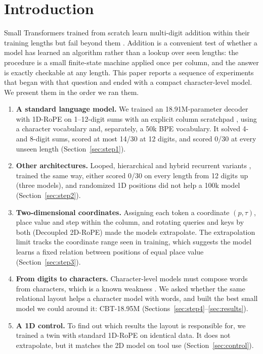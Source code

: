 \documentclass[10pt,twocolumn]{article}
\begin{document}
\section{Introduction}\label{sec:intro}

Small Transformers trained from scratch learn multi-digit addition within their training lengths but fail beyond them \cite{nogueira2021investigating,jelassi2023length,dziri2023faith,kazemnejad2023impact,mcleish2024transformers}. Addition is a convenient test of whether a model has learned an algorithm rather than a lookup over seen lengths: the procedure is a small finite-state machine applied once per column, and the answer is exactly checkable at any length. This paper reports a sequence of experiments that began with that question and ended with a compact character-level model. We present them in the order we ran them.

\begin{enumerate}
\item \textbf{A standard language model.} We trained an 18.91M-parameter decoder with 1D-RoPE \cite{su2024roformer} on 1--12-digit sums with an explicit column scratchpad \cite{nye2021show,wei2022chainofthought}, using a character vocabulary and, separately, a 50k BPE vocabulary. It solved 4- and 8-digit sums, scored at most 14/30 at 12 digits, and scored 0/30 at every unseen length (Section~\ref{sec:step1}).
\item \textbf{Other architectures.} Looped, hierarchical and hybrid recurrent variants \cite{dehghani2019universal,giannou2023looped}, trained the same way, either scored 0/30 on every length from 12 digits up (three models), and randomized 1D positions \cite{ruoss2023randomized} did not help a 100k model (Section~\ref{sec:step2}).
\item \textbf{Two-dimensional coordinates.} Assigning each token a coordinate $(p, \tau)$, place value and step within the column, and rotating queries and keys by both (Decoupled 2D-RoPE) made the models extrapolate. The extrapolation limit tracks the coordinate range seen in training, which suggests the model learns a fixed relation between positions of equal place value (Section~\ref{sec:step3}).
\item \textbf{From digits to characters.} Character-level models must compose words from characters, which is a known weakness \cite{alrfou2019character,libovicky2022why,mielke2021between}. We asked whether the same relational layout helps a character model with words, and built the best small model we could around it: CBT-18.95M (Sections~\ref{sec:step4}--\ref{sec:results}).
\item \textbf{A 1D control.} To find out which results the layout is responsible for, we trained a twin with standard 1D-RoPE on identical data. It does not extrapolate, but it matches the 2D model on tool use (Section~\ref{sec:control}).
\end{enumerate}
\end{document}
